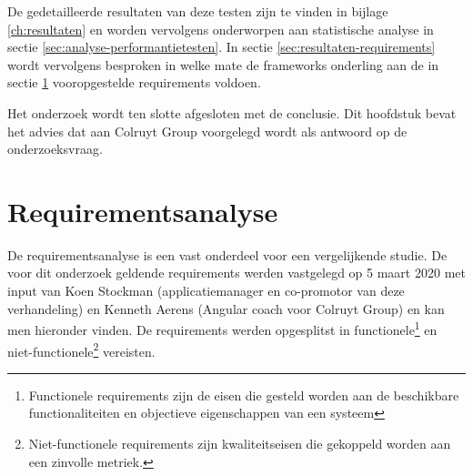 
De gedetailleerde resultaten van deze testen zijn te vinden in bijlage \ref{ch:resultaten} en worden vervolgens onderworpen aan statistische analyse in sectie \ref{sec:analyse-performantietesten}. In sectie \ref{sec:resultaten-requirements} wordt vervolgens besproken in welke mate de frameworks onderling aan de in sectie \ref{sec:meth-requirements} vooropgestelde requirements voldoen.

Het onderzoek wordt ten slotte afgesloten met de conclusie. Dit hoofdstuk bevat het advies dat aan Colruyt Group voorgelegd wordt als antwoord op de onderzoeksvraag.

\section{Requirementsanalyse}
\label{sec:meth-requirements}

De requirementsanalyse is een vast onderdeel voor een vergelijkende studie. De voor dit onderzoek geldende requirements werden vastgelegd op 5 maart 2020 met input van Koen Stockman (applicatiemanager en co-promotor van deze verhandeling) en Kenneth Aerens (Angular coach voor Colruyt Group) en kan men hieronder vinden. De requirements werden opgesplitst in functionele\footnote{Functionele requirements zijn de eisen die gesteld worden aan de beschikbare functionaliteiten en objectieve eigenschappen van een systeem} en niet-functionele\footnote{Niet-functionele requirements zijn kwaliteitseisen die gekoppeld worden aan een zinvolle metriek.} vereisten.

